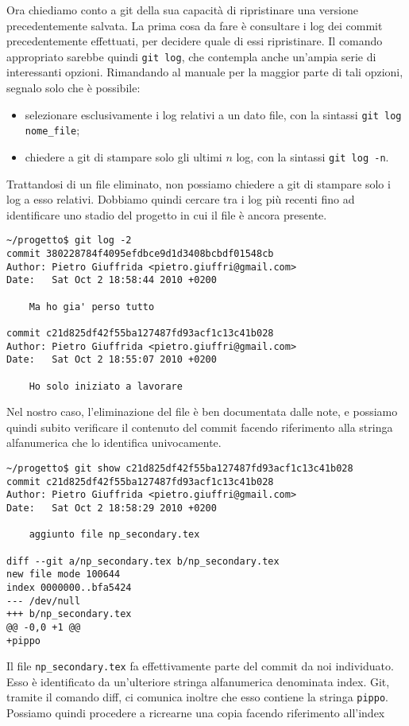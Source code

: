 \documentclass[a4paper,12pt,oneside]{article}
\begin{document}
Ora chiediamo conto a git della sua capacità di ripristinare una versione
precedentemente salvata. La prima cosa da fare è consultare i log dei commit
precedentemente effettuati, per decidere quale di essi ripristinare. Il comando
appropriato sarebbe quindi \lstinline|git log|, che contempla anche un'ampia
serie di interessanti opzioni. Rimandando al manuale per la maggior parte di tali
opzioni, segnalo solo che è possibile:
\begin{itemize}
\item selezionare esclusivamente i log relativi a un dato file, con la
  sintassi \lstinline|git log nome_file|;
\item chiedere a git di stampare solo gli ultimi $n$ log, con la
  sintassi \lstinline|git log -n|.
\end{itemize}
Trattandosi di un file eliminato, non possiamo chiedere a git di stampare solo i
log a esso relativi. Dobbiamo quindi cercare tra i log più recenti fino ad
identificare uno stadio del progetto in cui il file è ancora presente.
\begin{lstlisting}
~/progetto$ git log -2
commit 380228784f4095efdbce9d1d3408bcbdf01548cb
Author: Pietro Giuffrida <pietro.giuffri@gmail.com>
Date:   Sat Oct 2 18:58:44 2010 +0200

    Ma ho gia' perso tutto

commit c21d825df42f55ba127487fd93acf1c13c41b028
Author: Pietro Giuffrida <pietro.giuffri@gmail.com>
Date:   Sat Oct 2 18:55:07 2010 +0200

    Ho solo iniziato a lavorare
\end{lstlisting}
Nel nostro caso, l'eliminazione del file è ben documentata dalle note, e
possiamo quindi subito verificare il contenuto del commit facendo riferimento
alla stringa alfanumerica che lo identifica univocamente.
\begin{lstlisting}
~/progetto$ git show c21d825df42f55ba127487fd93acf1c13c41b028
commit c21d825df42f55ba127487fd93acf1c13c41b028
Author: Pietro Giuffrida <pietro.giuffri@gmail.com>
Date:   Sat Oct 2 18:58:29 2010 +0200

    aggiunto file np_secondary.tex

diff --git a/np_secondary.tex b/np_secondary.tex
new file mode 100644
index 0000000..bfa5424
--- /dev/null
+++ b/np_secondary.tex
@@ -0,0 +1 @@
+pippo
\end{lstlisting}
Il file \lstinline|np_secondary.tex| fa effettivamente parte del commit da noi
individuato. Esso è identificato da un'ulteriore stringa alfanumerica
denominata index. Git, tramite il comando diff, ci comunica inoltre che esso
contiene la stringa \lstinline|pippo|.
Possiamo quindi procedere a ricrearne una copia facendo riferimento all'index
\end{document}
